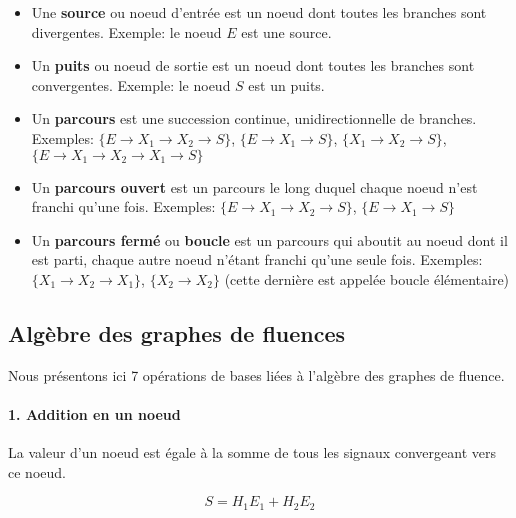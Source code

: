 \begin{itemize}
    \item Une \textbf{source} ou noeud d'entrée est un noeud dont 
        toutes les branches sont divergentes. Exemple: le noeud $E$ est une source.
    \item Un \textbf{puits} ou noeud de sortie est un noeud dont toutes 
    les branches sont convergentes. Exemple: le noeud $S$ est un puits.
    \item Un \textbf{parcours} est une succession continue, 
    unidirectionnelle de branches. Exemples: $\{E\rightarrow X_1\rightarrow X_2\rightarrow S\}$, 
    $\{E\rightarrow X_1\rightarrow S\}$, $\{X_1\rightarrow X_2\rightarrow S\}$, $\{E\rightarrow X_1\rightarrow X_2\rightarrow X_1\rightarrow S\}$

    \item Un \textbf{parcours ouvert} est un parcours le long duquel chaque 
          noeud n'est franchi qu'une fois. Exemples: $\{E\rightarrow X_1\rightarrow X_2\rightarrow S\}$, $\{E\rightarrow X_1 \rightarrow S\}$
    \item Un \textbf{parcours fermé} ou \textbf{boucle} est un parcours qui 
        aboutit au noeud dont il est parti, chaque autre noeud n'étant franchi qu'une seule fois. 
        Exemples: $\{X_1\rightarrow X_2\rightarrow X_1\}$, $\{X_2\rightarrow X_2\}$ (cette dernière est appelée boucle élémentaire)
\end{itemize}

\subsection{Algèbre des graphes de fluences}
Nous présentons ici 7 opérations de bases liées à l'algèbre des graphes de fluence.

\paragraph{1. Addition en un noeud}

La valeur d'un noeud est égale à la somme de tous les signaux convergeant vers ce noeud.
\begin{center}
\end{center}
$$
S=H_1E_1+H_2E_2
$$

